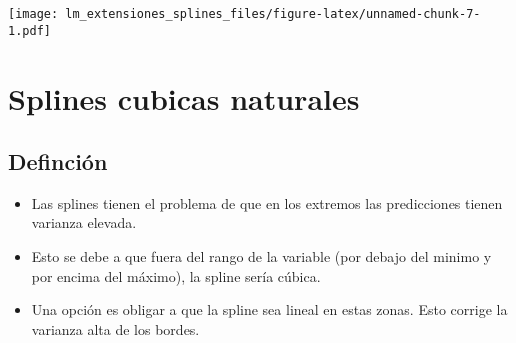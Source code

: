 \documentclass[
]{article}
\newenvironment{Shaded}{\begin{snugshade}}{\end{snugshade}}
\newcommand{\CommentTok}[1]{\textcolor[rgb]{0.56,0.35,0.01}{\textit{#1}}}
\newcommand{\DataTypeTok}[1]{\textcolor[rgb]{0.13,0.29,0.53}{#1}}
\newcommand{\DecValTok}[1]{\textcolor[rgb]{0.00,0.00,0.81}{#1}}
\newcommand{\KeywordTok}[1]{\textcolor[rgb]{0.13,0.29,0.53}{\textbf{#1}}}
\newcommand{\NormalTok}[1]{#1}
\newcommand{\OperatorTok}[1]{\textcolor[rgb]{0.81,0.36,0.00}{\textbf{#1}}}
\newcommand{\StringTok}[1]{\textcolor[rgb]{0.31,0.60,0.02}{#1}}
\begin{document}
\begin{Shaded}
\end{Shaded}

\texttt{[image: lm\_extensiones\_splines\_files/figure-latex/unnamed-chunk-7-1.pdf]}

\hypertarget{splines-cubicas-naturales}{%
\section{Splines cubicas naturales}\label{splines-cubicas-naturales}}

\hypertarget{definciuxf3n}{%
\subsection{Definción}\label{definciuxf3n}}

\begin{itemize}
\item
  Las splines tienen el problema de que en los extremos las predicciones
  tienen varianza elevada.
\item
  Esto se debe a que fuera del rango de la variable (por debajo del
  minimo y por encima del máximo), la spline sería cúbica.
\item
  Una opción es obligar a que la spline sea lineal en estas zonas. Esto
  corrige la varianza alta de los bordes.
\end{itemize}
\end{document}
